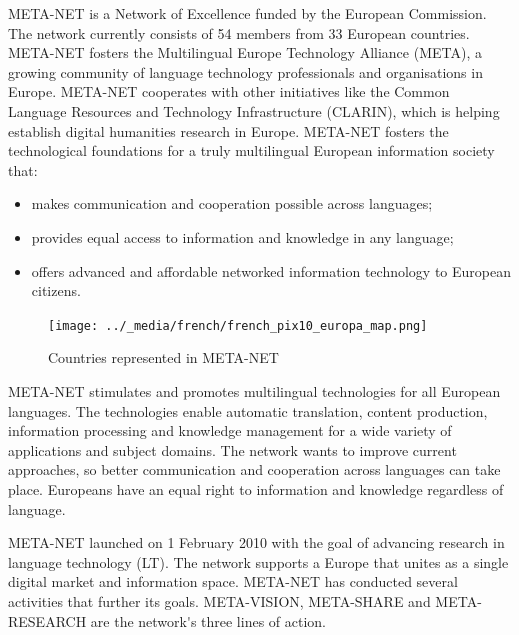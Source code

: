 \clearpage


\begin{multicols}{2}
META-NET is a Network of Excellence funded by the European Commission. The network currently consists of 54 members from 33 European countries. META-NET fosters the Multilingual Europe Technology Alliance (META), a growing community of language technology professionals and organisations in Europe. META-NET cooperates with other initiatives like the Common Language Resources and Technology Infrastructure (CLARIN), which is helping establish digital humanities research in Europe. META-NET fosters the technological foundations for a truly multilingual European information society that:

\begin{itemize}
\item makes communication and cooperation possible across languages;
\item provides equal access to information and knowledge in any language;
\item offers advanced and affordable networked information technology to European citizens.
\end{itemize}

\begin{figure}[!ht]
\begin{center}
  \texttt{[image: ../\_media/french/french\_pix10\_europa\_map.png]}
  \caption{Countries represented in META-NET}
  \label{fig:metanet_countries}
\end{center}
\end{figure}

META-NET stimulates and promotes multilingual technologies for all European languages. The technologies enable automatic translation, content production, information processing and knowledge management for a wide variety of applications and subject domains. The network wants to improve current approaches, so better communication and cooperation across languages can take place. Europeans have an equal right to information and knowledge regardless of language.

META-NET launched on 1 February 2010 with the goal of advancing research in language technology (LT). The network supports a Europe that unites as a single digital market and information space. META-NET has conducted several activities that further its goals. META-VISION, META-SHARE and META-RESEARCH are the network{\mbox '}s three lines of action.


\end{multicols}
